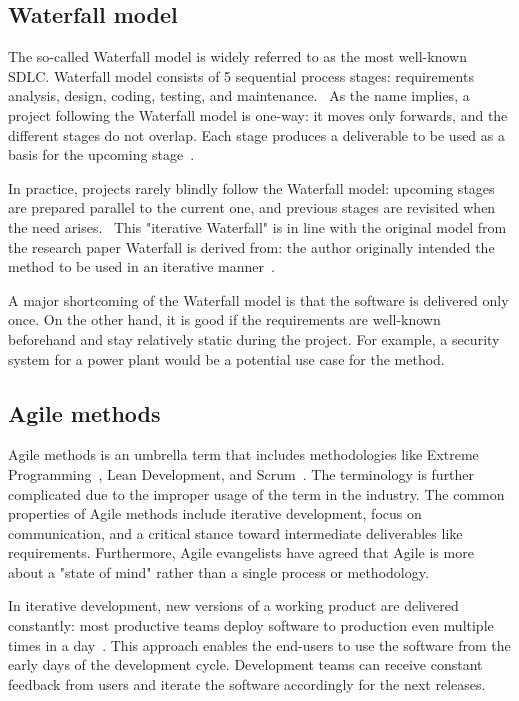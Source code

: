 \subsection{Waterfall model}

The so-called Waterfall model is widely referred to as the most well-known SDLC. Waterfall model consists of 5 sequential process stages: requirements analysis, design, coding, testing, and maintenance.~\cite{alshamrani_comparison_2015} As the name implies, a project following the Waterfall model is one-way: it moves only forwards, and the different stages do not overlap. Each stage produces a deliverable to be used as a basis for the upcoming stage~\cite{balaji_waterfall_2012}. 

In practice, projects rarely blindly follow the Waterfall model: upcoming stages are prepared parallel to the current one, and previous stages are revisited when the need arises.~\cite{sommerville_software_2016} This "iterative Waterfall" is in line with the original model from the research paper Waterfall is derived from: the author originally intended the method to be used in an iterative manner~\cite{royce_managing_1987}.

A major shortcoming of the Waterfall model is that the software is delivered only once. On the other hand, it is good if the requirements are well-known beforehand and stay relatively static during the project. For example, a security system for a power plant would be a potential use case for the method.

\subsection{Agile methods}

Agile methods is an umbrella term that includes methodologies like Extreme Programming~\cite{wells_don_extreme_2018}, Lean Development, and Scrum~\cite{scrumorg_home_2022}. The terminology is further complicated due to the improper usage of the term in the industry. The common properties of Agile methods include iterative development, focus on communication, and a critical stance toward intermediate deliverables like requirements. Furthermore, Agile evangelists have agreed that Agile is more about a "state of mind" rather than a single process or methodology.~\cite{cohen_introduction_2004}

In iterative development, new versions of a working product are delivered constantly: most productive teams deploy software to production even multiple times in a day~\cite{forsgren_accelerate_2018}. This approach enables the end-users to use the software from the early days of the development cycle. Development teams can receive constant feedback from users and iterate the software accordingly for the next releases.~\cite{balaji_waterfall_2012}

